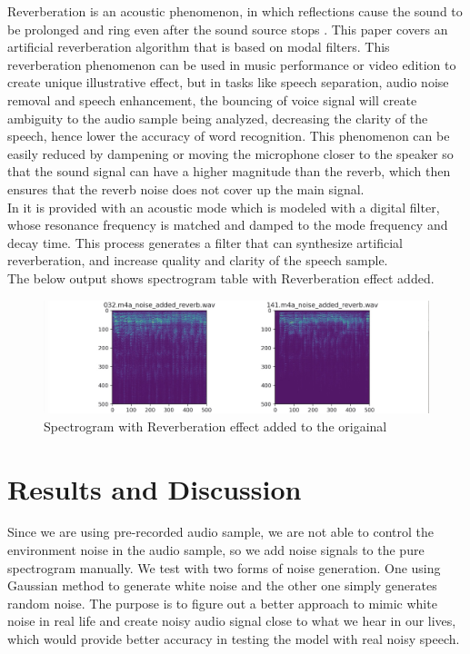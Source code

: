 \documentclass[runningheads,a4paper]{llncs}
\begin{document}
Reverberation is an acoustic phenomenon, in which reflections cause the sound to be prolonged and ring even after the sound source stops \cite{24}. This paper covers an artificial reverberation algorithm that is based on modal filters. This reverberation phenomenon can be used in music performance or video edition to create unique illustrative effect, but in tasks like speech separation, audio noise removal and speech enhancement, the bouncing of voice signal will create ambiguity to the audio sample being analyzed, decreasing the clarity of the speech, hence lower the accuracy of word recognition. This phenomenon can be easily reduced by dampening or moving the microphone closer to the speaker so that the sound signal can have a higher magnitude than the reverb, which then ensures that the reverb noise does not cover up the main signal.\\
 
In \cite{24} it is provided with an acoustic mode which is modeled with a digital filter, whose resonance frequency is matched and damped to the mode frequency and decay time. This process generates a filter that can synthesize artificial reverberation, and increase quality and clarity of the speech sample.\\

The below output shows spectrogram table with Reverberation effect added.\\

\begin{figure}[H]
\includegraphics[scale=0.25]{reverb.jpeg}
\caption{Spectrogram with Reverberation effect added to the origainal }
\label{fig:framework}
\end{figure}

\section{Results and Discussion}
Since we are using pre-recorded audio sample, we are not able to control the environment noise in the audio sample, so we add noise signals to the pure spectrogram manually. We test with two forms of noise generation. One using Gaussian method to generate white noise and the other one simply generates random noise. The purpose is to figure out a better approach to mimic white noise in real life and create noisy audio signal close to what we hear in our lives, which would provide better accuracy in testing the model with real noisy speech.\\
\end{document}
